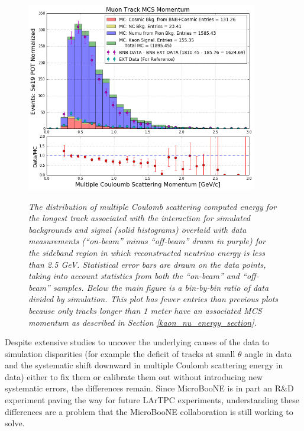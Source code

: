 \begin{figure}[ht!]
\centering
	\includegraphics[width=0.9\textwidth]{Figures/kaon_sideband_comp_MCS.png} \\
\caption{\textit{The distribution of multiple Coulomb scattering computed energy for the longest track associated with the interaction for simulated backgrounds and signal (solid histograms) overlaid with data measurements (``on-beam'' minus ``off-beam'' drawn in purple) for the sideband region in which reconstructed neutrino energy is less than 2.5 GeV. Statistical error bars are drawn on the data points, taking into account statistics from both the ``on-beam'' and ``off-beam'' samples. Below the main figure is a bin-by-bin ratio of data divided by simulation. This plot has fewer entries than previous plots because only tracks longer than 1 meter have an associated MCS momentum as described in Section \ref{kaon_nu_energy_section}.}}\label{kaon_sideband_comp_MCS}
\end{figure}


Despite extensive studies to uncover the underlying causes of the data to simulation disparities (for example the deficit of tracks at small $\theta$ angle in data and the systematic shift downward in multiple Coulomb scattering energy in data) either to fix them or calibrate them out without introducing new systematic errors, the differences remain. Since MicroBooNE is in part an R\&D experiment paving the way for future LArTPC experiments, understanding these differences are a problem that the MicroBooNE collaboration is still working to solve.\\

